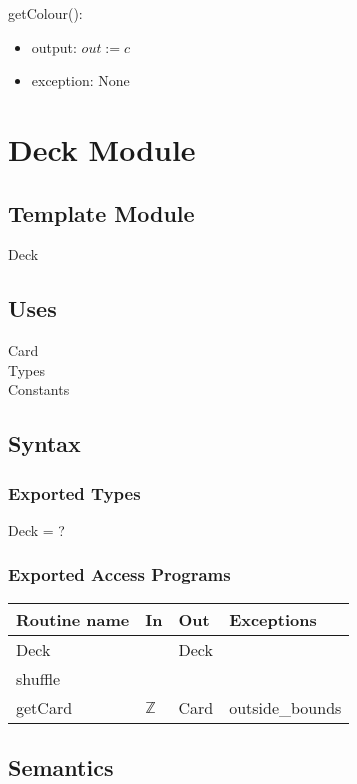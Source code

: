 \documentclass[12pt]{article}
\begin{document}
\noindent getColour():
\begin{itemize}
	\item output: $out := c$
	\item exception: None
\end{itemize}

\newpage

\section* {Deck Module}

\subsection*{Template Module}

Deck

\subsection* {Uses}

Card\\
Types\\
Constants

\subsection* {Syntax}

\subsubsection* {Exported Types}

Deck = ? 

\subsubsection* {Exported Access Programs}

\begin{tabular}{| l | l | l | l |}
	\hline
	\textbf{Routine name} & \textbf{In} & \textbf{Out} & \textbf{Exceptions}\\
	\hline
	Deck & ~ & Deck & \\
	\hline
	shuffle & ~ & ~ & ~\\
	\hline
	getCard & $\mathbb{Z}$ & Card & outside\_bounds\\
	\hline

\end{tabular}

\subsection* {Semantics}
\end{document}
